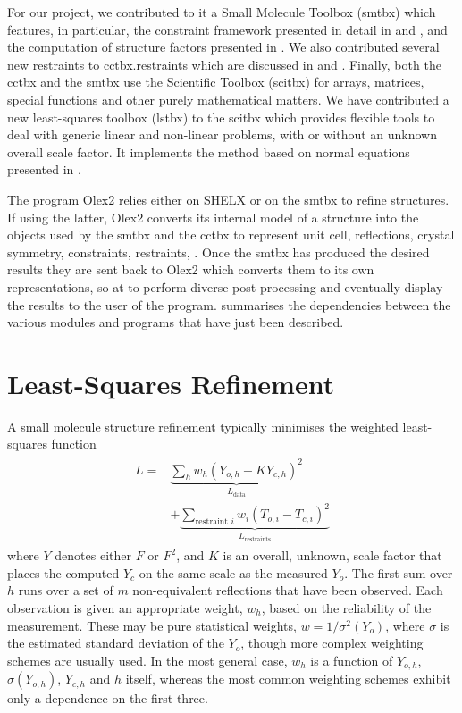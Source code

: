 \documentclass[pdf]{iucr}
\begin{document}
For our project, we contributed to it a Small Molecule Toolbox (smtbx) which features, in particular, the constraint framework presented in detail in  and , and the computation of structure factors presented in . We also contributed several new restraints to cctbx.restraints which are discussed in  and . Finally, both the cctbx and the smtbx use the Scientific Toolbox (scitbx) for arrays, matrices, special functions and other purely mathematical matters. We have contributed a new least-squares toolbox (lstbx) to the scitbx which provides flexible tools to deal with generic linear and non-linear problems, with or without an unknown overall scale factor. It implements the method based on normal equations presented in .

The program Olex2 relies either on SHELX or on the smtbx to refine structures. If using the latter, Olex2 converts its internal model of a structure into the objects used by the smtbx and the cctbx to represent unit cell, reflections, crystal symmetry, constraints, restraints, . Once the smtbx has produced the desired results they are sent back to Olex2 which converts them to its own representations, so at to perform diverse post-processing and eventually display the results to the user of the program.  summarises the dependencies between the various modules and programs that have just been described.  

\section{Least-Squares Refinement}
\newcommand{\data}{\text{data}}
\newcommand{\restraints}{\text{restraints}}

A small molecule structure refinement typically minimises the weighted least-squares function
\begin{align}
\begin{split}
L = &\underbrace{\sum_h w_h \left( Y_{o,h} - K Y_{c,h} \right)^2}_{L_\data} \\
  &+ \underbrace{\sum_{\text{restraint } i} w_i \left( T_{o,i} - T_{c,i} \right)^2}_{L_\restraints}
\label{eqn:L:def}
\end{split}
\end{align}
where $Y$ denotes either $F$ or $F^2$, and $K$ is an overall, unknown, scale factor that places the computed $Y_c$ on the same scale as the measured $Y_o$. The first sum over $h$ runs over a set of $m$ non-equivalent reflections that have been observed. Each observation is given an appropriate weight, $w_h$, based on the reliability of the measurement. These may be pure statistical weights, $w = 1/\sigma^2(Y_o)$, where $\sigma$ is the estimated standard deviation of the $Y_o$, though more complex weighting schemes are usually used. In the most general case, $w_h$ is a function of $Y_{o,h}$, $\sigma(Y_{o,h})$, $Y_{c,h}$ and $h$ itself, whereas the most common weighting schemes exhibit only a dependence on the first three.
\end{document}
